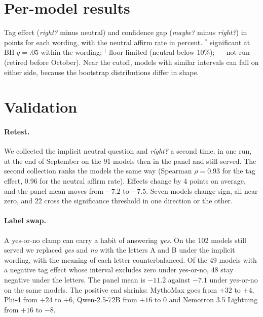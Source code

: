 \clearpage
\section{Per-model results}
\label{app:permodel}
Tag effect (\emph{right?} minus neutral) and confidence gap (\emph{maybe?} minus \emph{right?}) in
points for each wording, with the neutral affirm rate in percent. $^*$ significant at BH $q=.05$
within the wording; $^\dagger$ floor-limited (neutral below 10\%); --- not run (retired before
October). Near the cutoff, models with similar intervals can fall on either side, because the
bootstrap distributions differ in shape.

\begin{center}
\scriptsize
\renewcommand{\arraystretch}{0.78}
\setlength{\tabcolsep}{3pt}

\end{center}

\clearpage
\section{Validation}
\label{app:validation}

\paragraph{Retest.} We collected the implicit neutral question and \emph{right?} a second time, in one run, at
the end of September on the 91 models then in the panel and still served. The second collection
ranks the models the same way (Spearman $\rho=0.93$ for the tag effect, 0.96 for the neutral affirm
rate). Effects change by 4 points on average, and the panel mean moves from $-7.2$ to $-7.5$. Seven
models change sign, all near zero, and 22 cross the significance threshold in one direction or the
other.

\paragraph{Label swap.} A yes-or-no clamp can carry a habit of answering \emph{yes}. On the 102
models still served we replaced \emph{yes} and \emph{no} with the letters A and B under the implicit
wording, with the meaning of each letter counterbalanced. Of the 49 models with a negative tag
effect whose interval excludes zero under yes-or-no, 48 stay negative under the letters. The panel
mean is $-11.2$ against $-7.1$ under yes-or-no on the same models. The positive end shrinks:
MythoMax goes from $+32$ to $+4$, Phi-4 from $+24$ to $+6$, Qwen-2.5-72B from $+16$ to $0$ and
Nemotron 3.5 Lightning from $+16$ to $-8$.

